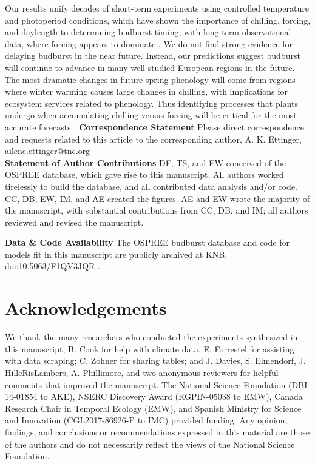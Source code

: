 \documentclass{article}
\begin{document}
 \par Our results unify decades of short-term experiments using controlled temperature and photoperiod conditions, which have shown the importance of chilling, forcing, and daylength to determining budburst timing, with long-term observational data, where forcing appears to dominate \emph{\citep[e.g.,][]{roberts2015}}. We do not find strong evidence for delaying budburst in the near future. Instead, our predictions suggest budburst will continue to advance in many well-studied European regions in the future. The most dramatic changes in future spring phenology will come from regions where winter warming causes large changes in chilling, with implications for ecosystem services related to phenology. Thus identifying processes that plants undergo when accumulating chilling versus forcing will be critical for the most accurate forecasts \emph{\citep{chuine2016,Singh:2017}}. 
\textbf{Correspondence Statement}
Please direct correspondence and requests related to this article to the corresponding author, A. K. Ettinger, ailene.ettinger@tnc.org\\
\textbf{Statement of Author Contributions} 
DF, TS, and EW conceived of the OSPREE database, which gave rise to this manuscript. All authors worked tirelessly to build the database, and all contributed data analysis and/or code. CC, DB, EW, IM, and AE created the figures. AE and EW wrote the majority of the manuscript, with substantial contributions from CC, DB, and IM; all authors reviewed and revised the manuscript. 

\textbf{Data \& Code Availability} The OSPREE budburst database and code for models fit in this manuscript are publicly archived at KNB, doi:10.5063/F1QV3JQR \citep{wolkovich2019}.

\section*{Acknowledgements}
We thank the many researchers who conducted the experiments synthesized in this manuscript, B. Cook for help with climate data, E. Forrestel for assisting with data scraping; C. Zohner for sharing tables; and J. Davies, S. Elmendorf, J. HilleRisLambers, A. Phillimore, and two anonymous reviewers for helpful comments that improved the manuscript. The National Science Foundation (DBI 14-01854 to AKE), NSERC Discovery Award (RGPIN-05038 to EMW), Canada Research Chair in Temporal Ecology (EMW), and Spanish Ministry for Science and Innovation (CGL2017-86926-P to IMC) provided funding. Any opinion, findings, and conclusions or recommendations expressed in this material are those of the authors and do not necessarily reflect the views of the National Science Foundation.

\end{document}

